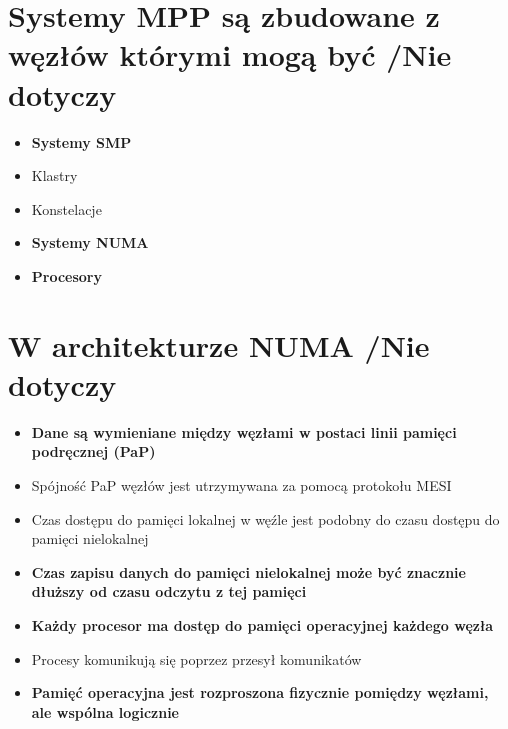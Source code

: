 \section{Systemy MPP są zbudowane z węzłów którymi mogą być {\small /Nie dotyczy}}
	\begin{itemize}
    \item \textbf{Systemy SMP}
    \item Klastry
    \item Konstelacje
    \item \textbf{Systemy NUMA}
    \item \textbf{Procesory}
    \end{itemize}

\section{W architekturze NUMA {\small /Nie dotyczy}}
	\begin{itemize}
    \item \textbf{Dane są wymieniane między węzłami w postaci linii pamięci podręcznej (PaP)}
    \item Spójność PaP węzłów jest utrzymywana za pomocą protokołu MESI
    \item Czas dostępu do pamięci lokalnej w węźle jest podobny do czasu dostępu do pamięci nielokalnej
    \item \textbf{Czas zapisu danych do pamięci nielokalnej może być znacznie dłuższy od czasu odczytu z tej pamięci}
    \item \textbf{Każdy procesor ma dostęp do pamięci operacyjnej każdego węzła}
    \item Procesy komunikują się poprzez przesył komunikatów
    \item \textbf{Pamięć operacyjna jest rozproszona fizycznie pomiędzy węzłami, ale wspólna logicznie}
    \end{itemize}

